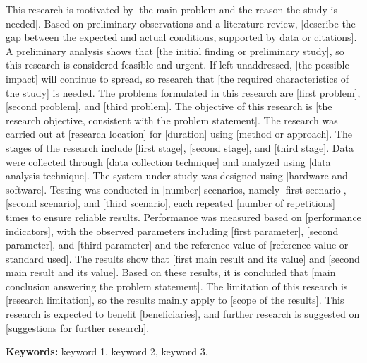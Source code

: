 \begin{halamanbaru}\end{halamanbaru}
\begin{abstrak}
This research is motivated by [the main problem and the reason the study is needed]. Based on preliminary observations and a literature review, [describe the gap between the expected and actual conditions, supported by data or citations]. A preliminary analysis shows that [the initial finding or preliminary study], so this research is considered feasible and urgent. If left unaddressed, [the possible impact] will continue to spread, so research that [the required characteristics of the study] is needed. The problems formulated in this research are [first problem], [second problem], and [third problem]. The objective of this research is [the research objective, consistent with the problem statement]. The research was carried out at [research location] for [duration] using [method or approach]. The stages of the research include [first stage], [second stage], and [third stage]. Data were collected through [data collection technique] and analyzed using [data analysis technique]. The system under study was designed using [hardware and software]. Testing was conducted in [number] scenarios, namely [first scenario], [second scenario], and [third scenario], each repeated [number of repetitions] times to ensure reliable results. Performance was measured based on [performance indicators], with the observed parameters including [first parameter], [second parameter], and [third parameter] and the reference value of [reference value or standard used]. The results show that [first main result and its value] and [second main result and its value]. Based on these results, it is concluded that [main conclusion answering the problem statement]. The limitation of this research is [research limitation], so the results mainly apply to [scope of the results]. This research is expected to benefit [beneficiaries], and further research is suggested on [suggestions for further research].

\textbf{Keywords:} keyword 1, keyword 2, keyword 3.
\end{abstrak}

\begin{halamanbaru}\end{halamanbaru}
